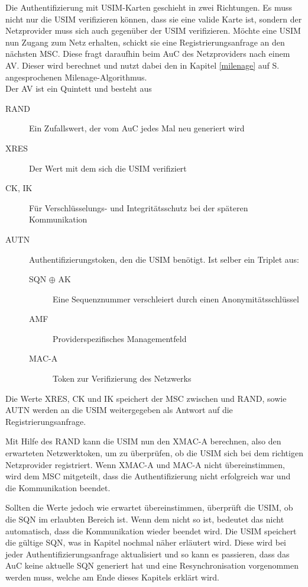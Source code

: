  Die Authentifizierung mit \ac{USIM}-Karten geschieht in zwei Richtungen. Es muss nicht nur die
 USIM verifizieren können, dass sie eine valide Karte ist, sondern der Netzprovider muss sich auch
 gegenüber der USIM verifizieren. Möchte eine USIM nun Zugang zum Netz erhalten, schickt sie
 eine Registrierungsanfrage an den nächsten \ac{MSC}. Diese fragt daraufhin beim \ac{AuC} des
 Netzproviders nach einem \ac{AV}. Dieser wird berechnet und nutzt dabei den in Kapitel
 \ref{milenage} auf S. \pageref{milenage} angesprochenen Milenage-Algorithmus. \\
 Der AV ist ein Quintett und besteht aus
 
 \begin{description}
  \item [RAND] Ein Zufallswert, der vom AuC jedes Mal neu generiert wird
  \item [XRES] Der Wert mit dem sich die USIM verifiziert
  \item [CK, IK] Für Verschlüsselungs- und Integritätsschutz bei der späteren Kommunikation
  \item [AUTN] Authentifizierungstoken, den die USIM benötigt. Ist selber ein Triplet aus:
  \begin{description}
   \item [SQN $\oplus$ AK] Eine Sequenznummer verschleiert durch einen Anonymitätsschlüssel
   \item [AMF] Providerspezifisches Managementfeld
   \item [MAC-A] Token zur Verifizierung des Netzwerks
  \end{description}
 \end{description}
 
 Die Werte XRES, CK und IK speichert der MSC zwischen und RAND, sowie AUTN werden an die USIM
 weitergegeben als Antwort auf die Registrierungsanfrage.

 Mit Hilfe des RAND kann die USIM nun den XMAC-A berechnen, also den erwarteten Netzwerktoken, um
 zu überprüfen, ob die USIM sich bei dem richtigen Netzprovider registriert. Wenn XMAC-A
 und MAC-A nicht übereinstimmen, wird dem MSC mitgeteilt, dass die Authentifizierung nicht erfolgreich
 war und die Kommunikation beendet.

 Sollten die Werte jedoch wie erwartet übereinstimmen, überprüft die USIM, ob die SQN im erlaubten
 Bereich ist. Wenn dem nicht so ist, bedeutet das nicht automatisch, dass die Kommunikation wieder
 beendet wird. Die USIM speichert die gültige SQN, was in Kapitel 
 nochmal näher erläutert wird. Diese wird bei jeder Authentifizierungsanfrage aktualisiert und so kann
 es passieren, dass das AuC keine aktuelle SQN generiert hat und eine Resynchronisation vorgenommen
 werden muss, welche am Ende dieses Kapitels erklärt wird.
 
